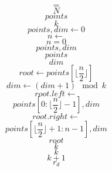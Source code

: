 \documentclass{scrreprt}
\begin{document}
\begin{equation}
=
\end{equation}
\begin{equation}
N
\end{equation}
\begin{equation}
points
\end{equation}
\begin{equation}
k
\end{equation}
\begin{equation}
points, dim\gets0
\end{equation}
\begin{equation}
n\gets
\end{equation}
\begin{equation}
n=0
\end{equation}
\begin{equation}
points, dim
\end{equation}
\begin{equation}
points
\end{equation}
\begin{equation}
dim
\end{equation}
\begin{equation}
root\gets{}points\left[\lfloor\frac{n}{2}\rfloor\right]
\end{equation}
\begin{equation}
dim\gets(dim+1)\mod{k}
\end{equation}
\begin{equation}
root.left \gets
\end{equation}
\begin{equation}
points\left[0:\lfloor\frac{n}{2}\rfloor-1\right], dim
\end{equation}
\begin{equation}
root.right \gets
\end{equation}
\begin{equation}
points\left[\lfloor\frac{n}{2}\rfloor+1:n-1\right], dim
\end{equation}
\begin{equation}
root
\end{equation}
\begin{equation}
k
\end{equation}
\begin{equation}
k
\end{equation}
\begin{equation}
k+1
\end{equation}
\begin{equation}
r_d
\end{equation}
\end{document}
